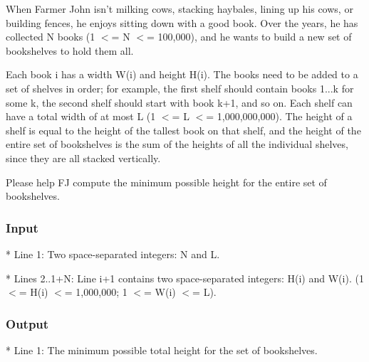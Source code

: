 

When Farmer John isn't milking cows, stacking haybales, lining up his cows, or building fences, he enjoys sitting down with a good book.  Over the years, he has collected N books (1 $<$= N $<$= 100,000), and he wants to build a new set of bookshelves to hold them all. 

Each book i has a width W(i) and height H(i).  The books need to be added to a set of shelves in order; for example, the first shelf should contain books 1...k for some k, the second shelf should start with book k+1, and so on.  Each shelf can have a total width of at most L (1 $<$= L $<$= 1,000,000,000).  The height of a shelf is equal to the height of the tallest book on that shelf, and the height of the entire set of bookshelves is the sum of the heights of all the individual shelves, since they are all stacked vertically. 

Please help FJ compute the minimum possible height for the entire set of bookshelves.

\subsubsection{Input}

* Line 1: Two space-separated integers: N and L.

* Lines 2..1+N: Line i+1 contains two space-separated integers: H(i)         and W(i).  (1 $<$= H(i) $<$= 1,000,000; 1 $<$= W(i) $<$= L).

\subsubsection{Output}

* Line 1: The minimum possible total height for the set of         bookshelves. 

